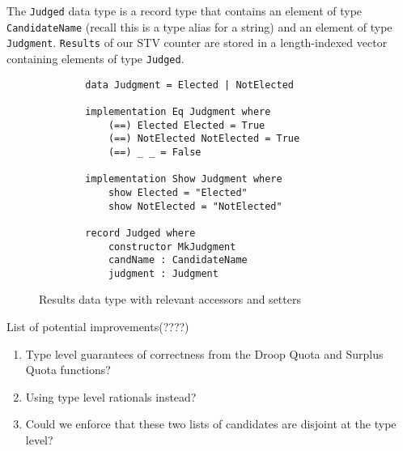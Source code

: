 The \texttt{Judged} data type is a record type that contains an element of type
\texttt{CandidateName} (recall this is a type alias for a string) and an element
of type \texttt{Judgment}. \texttt{Results} of our STV counter are stored in a
length-indexed vector containing elements of type \texttt{Judged}.

\begin{figure}[ht!!!!!!!!!!!!!!]
    \caption{Results data type with relevant accessors and setters}
    \label{judgments_code}
    \begin{lstlisting}
        data Judgment = Elected | NotElected
        
        implementation Eq Judgment where
            (==) Elected Elected = True
            (==) NotElected NotElected = True
            (==) _ _ = False

        implementation Show Judgment where
            show Elected = "Elected"
            show NotElected = "NotElected"

        record Judged where
            constructor MkJudgment
            candName : CandidateName
            judgment : Judgment
    \end{lstlisting}
\end{figure}


List of potential improvements(????)
\begin{enumerate}
    \item Type level guarantees of correctness from the Droop Quota and Surplus Quota functions?
    \item Using type level rationals instead?
    \item Could we enforce that these two lists of candidates are disjoint at the type level?
\end{enumerate}